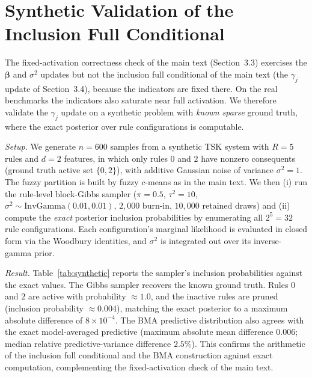 \documentclass[review,1p,times]{elsarticle}
\begin{document}
\FloatBarrier

\section{Synthetic Validation of the Inclusion Full Conditional}

The fixed-activation correctness check of the main text (Section~3.3) exercises the $\boldsymbol{\beta}$ and $\sigma^2$ updates but not the inclusion full conditional of the main text (the $\gamma_j$ update of Section~3.4), because the indicators are fixed there. On the real benchmarks the indicators also saturate near full activation. We therefore validate the $\gamma_j$ update on a synthetic problem with \emph{known sparse} ground truth, where the exact posterior over rule configurations is computable.

\emph{Setup.} We generate $n=600$ samples from a synthetic TSK system with $R=5$ rules and $d=2$ features, in which only rules $0$ and $2$ have nonzero consequents (ground truth active set $\{0,2\}$), with additive Gaussian noise of variance $\sigma^2=1$. The fuzzy partition is built by fuzzy $c$-means as in the main text.
We then (i) run the rule-level block-Gibbs sampler ($\pi=0.5$, $\tau^2=10$, $\sigma^2\sim\mathrm{InvGamma}(0.01,0.01)$, $2{,}000$ burn-in, $10{,}000$ retained draws) and (ii) compute the \emph{exact} posterior inclusion probabilities by enumerating all $2^5=32$ rule configurations.
Each configuration's marginal likelihood is evaluated in closed form via the Woodbury identities, and $\sigma^2$ is integrated out over its inverse-gamma prior.

\emph{Result.} Table~\ref{tab:synthetic} reports the sampler's inclusion probabilities against the exact values.
The Gibbs sampler recovers the known ground truth.
Rules $0$ and $2$ are active with probability $\approx1.0$, and the inactive rules are pruned (inclusion probability $\approx0.004$), matching the exact posterior to a maximum absolute difference of $8\times10^{-4}$. The BMA predictive distribution also agrees with the exact model-averaged predictive (maximum absolute mean difference $0.006$; median relative predictive-variance difference $2.5\%$). This confirms the arithmetic of the inclusion full conditional and the BMA construction against exact computation, complementing the fixed-activation check of the main text.
\end{document}
